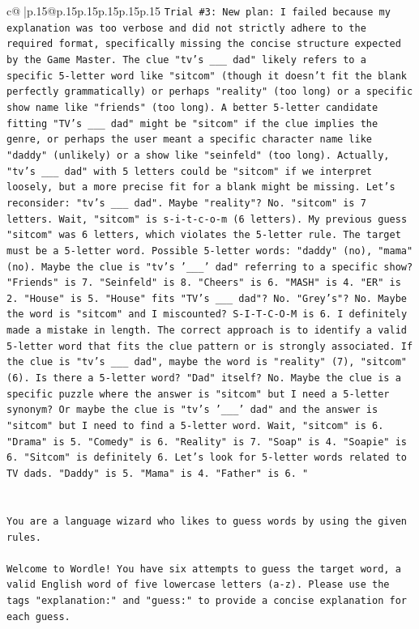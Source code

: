 \documentclass{article}
\begin{document}
{\begin{supertabular}{c@{$\;$}|p{.15\linewidth}@{}p{.15\linewidth}p{.15\linewidth}p{.15\linewidth}p{.15\linewidth}p{.15\linewidth}}
{{{\texttt{Trial \#3: New plan: I failed because my explanation was too verbose and did not strictly adhere to the required format, specifically missing the concise structure expected by the Game Master. The clue "tv's \_\_\_ dad" likely refers to a specific 5{-}letter word like "sitcom" (though it doesn't fit the blank perfectly grammatically) or perhaps "reality" (too long) or a specific show name like "friends" (too long). A better 5{-}letter candidate fitting "TV's \_\_\_ dad" might be "sitcom" if the clue implies the genre, or perhaps the user meant a specific character name like "daddy" (unlikely) or a show like "seinfeld" (too long). Actually, "tv's \_\_\_ dad" with 5 letters could be "sitcom" if we interpret loosely, but a more precise fit for a blank might be missing. Let's reconsider: "tv's \_\_\_ dad". Maybe "reality"? No. "sitcom" is 7 letters. Wait, "sitcom" is s{-}i{-}t{-}c{-}o{-}m (6 letters). My previous guess "sitcom" was 6 letters, which violates the 5{-}letter rule. The target must be a 5{-}letter word. Possible 5{-}letter words: "daddy" (no), "mama" (no). Maybe the clue is "tv's '\_\_\_' dad" referring to a specific show? "Friends" is 7. "Seinfeld" is 8. "Cheers" is 6. "MASH" is 4. "ER" is 2. "House" is 5. "House" fits "TV's \_\_\_ dad"? No. "Grey's"? No. Maybe the word is "sitcom" and I miscounted? S{-}I{-}T{-}C{-}O{-}M is 6. I definitely made a mistake in length. The correct approach is to identify a valid 5{-}letter word that fits the clue pattern or is strongly associated. If the clue is "tv's \_\_\_ dad", maybe the word is "reality" (7), "sitcom" (6). Is there a 5{-}letter word? "Dad" itself? No. Maybe the clue is a specific puzzle where the answer is "sitcom" but I need a 5{-}letter synonym? Or maybe the clue is "tv's '\_\_\_' dad" and the answer is "sitcom" but I need to find a 5{-}letter word. Wait, "sitcom" is 6. "Drama" is 5. "Comedy" is 6. "Reality" is 7. "Soap" is 4. "Soapie" is 6. "Sitcom" is definitely 6. Let's look for 5{-}letter words related to TV dads. "Daddy" is 5. "Mama" is 4. "Father" is 6. "} \\
\\ 
\\ 
\texttt{You are a language wizard who likes to guess words by using the given rules.} \\
\\ 
\texttt{Welcome to Wordle! You have six attempts to guess the target word, a valid English word of five lowercase letters (a{-}z). Please use the tags "explanation:" and "guess:" to provide a concise explanation for each guess.} \\
}}}
\end{supertabular}}
\end{document}
